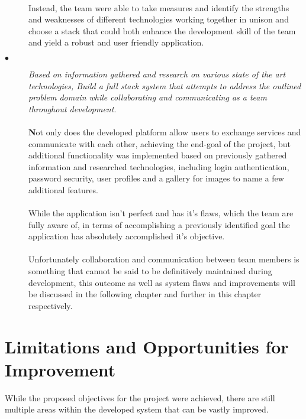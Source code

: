 \begin{description}
  \paragraph{}
  Instead, the team were able to take measures and identify the strengths and weaknesses of different technologies working together in unison and choose a stack that could both enhance the development skill of the team and yield a robust and user friendly application.
  
  \item[$\bullet$] \textit{Based on information gathered and research on various state of the art technologies, Build a full stack system that attempts to address the outlined problem domain while collaborating and communicating as a team throughout development}. 

  \paragraph{}
  \textbf{N}ot only does the developed platform allow users to exchange services and communicate with each other, achieving the end-goal of the project, but additional functionality was implemented based on previously gathered information and researched technologies, including login authentication, password security, user profiles and a gallery for images to name a few additional features.
  
  \paragraph{}
  While the application isn't perfect and has it's flaws, which the team are fully aware of, in terms of accomplishing a previously identified goal the application has absolutely accomplished it's objective. 
  
  \paragraph{}
  Unfortunately collaboration and communication between team members is something that cannot be said to be definitively maintained during development, this outcome as well as system flaws and improvements will be discussed in the following chapter and further in this chapter respectively.
\end{description}

\section{Limitations and Opportunities for Improvement}
While the proposed objectives for the project were achieved, there are still multiple areas within the developed system that can be vastly improved.

